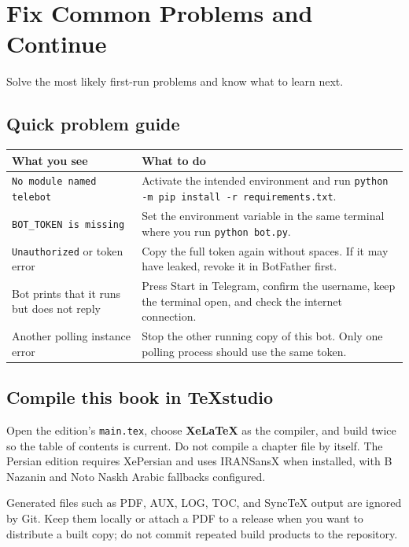 \chapter{Fix Common Problems and Continue}

\begin{goalbox}
Solve the most likely first-run problems and know what to learn next.
\end{goalbox}

\section{Quick problem guide}

\begin{tabular}{>{\raggedright\arraybackslash}p{}>{\raggedright\arraybackslash}p{}}
\toprule
\textbf{What you see} & \textbf{What to do} \\
\midrule
\texttt{No module named telebot} & Activate the intended environment and run
\texttt{python -m pip install -r requirements.txt}. \\
\addlinespace
\texttt{BOT\_TOKEN is missing} & Set the environment variable in the same
terminal where you run \texttt{python bot.py}. \\
\addlinespace
\texttt{Unauthorized} or token error & Copy the full token again without spaces.
If it may have leaked, revoke it in BotFather first. \\
\addlinespace
Bot prints that it runs but does not reply & Press Start in Telegram, confirm the
username, keep the terminal open, and check the internet connection. \\
\addlinespace
Another polling instance error & Stop the other running copy of this bot. Only
one polling process should use the same token. \\
\bottomrule
\end{tabular}

\section{Compile this book in TeXstudio}

Open the edition's \texttt{main.tex}, choose \textbf{XeLaTeX} as the compiler,
and build twice so the table of contents is current. Do not compile a chapter
file by itself. The Persian edition requires XePersian and uses IRANSansX when
installed, with B Nazanin and Noto Naskh Arabic fallbacks configured.

Generated files such as PDF, AUX, LOG, TOC, and SyncTeX output are ignored by
Git. Keep them locally or attach a PDF to a release when you want to distribute
a built copy; do not commit repeated build products to the repository.

